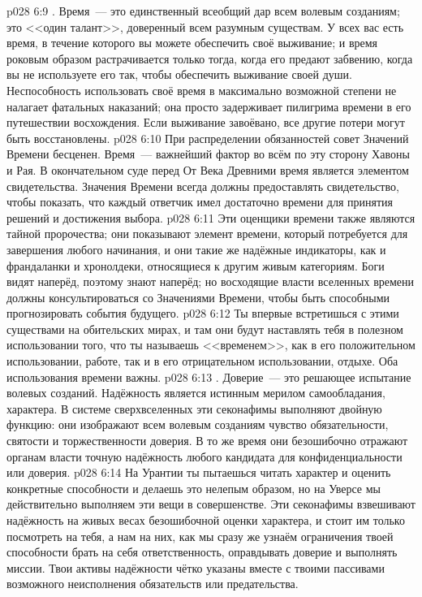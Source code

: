\vs p028 6:9 . Время~--- это единственный всеобщий дар всем волевым созданиям; это <<один талант>>, доверенный всем разумным существам. У всех вас есть время, в течение которого вы можете обеспечить своё выживание; и время роковым образом растрачивается только тогда, когда его предают забвению, когда вы не используете его так, чтобы обеспечить выживание своей души. Неспособность использовать своё время в максимально возможной степени не налагает фатальных наказаний; она просто задерживает пилигрима времени в его путешествии восхождения. Если выживание завоёвано, все другие потери могут быть восстановлены.
\vs p028 6:10 При распределении обязанностей совет Значений Времени бесценен. Время~--- важнейший фактор во всём по эту сторону Хавоны и Рая. В окончательном суде перед От Века Древними время является элементом свидетельства. Значения Времени всегда должны предоставлять свидетельство, чтобы показать, что каждый ответчик имел достаточно времени для принятия решений и достижения выбора.
\vs p028 6:11 Эти оценщики времени также являются тайной пророчества; они показывают элемент времени, который потребуется для завершения любого начинания, и они такие же надёжные индикаторы, как и франдаланки и хронолдеки, относящиеся к другим живым категориям. Боги видят наперёд, поэтому знают наперёд; но восходящие власти вселенных времени должны консультироваться со Значениями Времени, чтобы быть способными прогнозировать события будущего.
\vs p028 6:12 Ты впервые встретишься с этими существами на обительских мирах, и там они будут наставлять тебя в полезном использовании того, что ты называешь <<временем>>, как в его положительном использовании, работе, так и в его отрицательном использовании, отдыхе. Оба использования времени важны.
\vs p028 6:13 . Доверие~--- это решающее испытание волевых созданий. Надёжность является истинным мерилом самообладания, характера. В системе сверхвселенных эти секонафимы выполняют двойную функцию: они изображают всем волевым созданиям чувство обязательности, святости и торжественности доверия. В то же время они безошибочно отражают органам власти точную надёжность любого кандидата для конфиденциальности или доверия.
\vs p028 6:14 На Урантии ты пытаешься читать характер и оценить конкретные способности и делаешь это нелепым образом, но на Уверсе мы действительно выполняем эти вещи в совершенстве. Эти секонафимы взвешивают надёжность на живых весах безошибочной оценки характера, и стоит им только посмотреть на тебя, а нам на них, как мы сразу же узнаём ограничения твоей способности брать на себя ответственность, оправдывать доверие и выполнять миссии. Твои активы надёжности чётко указаны вместе с твоими пассивами возможного неисполнения обязательств или предательства.
